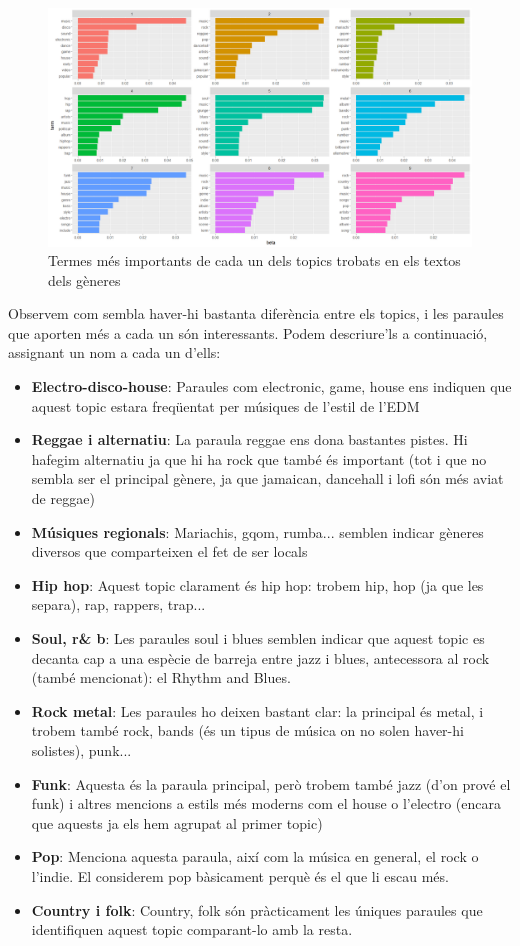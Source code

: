 \begin{figure}
    \centering
    \includegraphics[width=0.8\linewidth]{Images//8_Textual//Genres/genres_lda_topic_terms.png}
    \caption{Termes més importants de cada un dels topics trobats en els textos dels gèneres}
    \label{fig:textual_genres_lda_topics}
\end{figure}

Observem com sembla haver-hi bastanta diferència entre els topics, i les paraules que aporten més a cada un són interessants. Podem descriure'ls a continuació, assignant un nom a cada un d'ells:

\begin{itemize}
    \item \textbf{Electro-disco-house}: Paraules com electronic, game, house ens indiquen que aquest topic estara freqüentat per músiques de l'estil de l'EDM
    \item \textbf{Reggae i alternatiu}: La paraula reggae ens dona bastantes pistes. Hi hafegim alternatiu ja que hi ha rock que també és important (tot i que no sembla ser el principal gènere, ja que jamaican, dancehall i lofi són més aviat de reggae)
    \item \textbf{Músiques regionals}: Mariachis, gqom, rumba... semblen indicar gèneres diversos que comparteixen el fet de ser locals
    \item \textbf{Hip hop}: Aquest topic clarament és hip hop: trobem hip, hop (ja que les separa), rap, rappers, trap...
    \item \textbf{Soul, r\& b}: Les paraules soul i blues semblen indicar que aquest topic es decanta cap a una espècie de barreja entre jazz i blues, antecessora al rock (també mencionat): el Rhythm and Blues.
    \item \textbf{Rock metal}: Les paraules ho deixen bastant clar: la principal és metal, i trobem també rock, bands (és un tipus de música on no solen haver-hi solistes), punk...
    \item \textbf{Funk}: Aquesta és la paraula principal, però trobem també jazz (d'on prové el funk) i altres mencions a estils més moderns com el house o l'electro (encara que aquests ja els hem agrupat al primer topic)
    \item \textbf{Pop}: Menciona aquesta paraula, així com la música en general, el rock o l'indie. El considerem pop bàsicament perquè és el que li escau més.
    \item \textbf{Country i folk}: Country, folk són pràcticament les úniques paraules que identifiquen aquest topic comparant-lo amb la resta.
\end{itemize}

